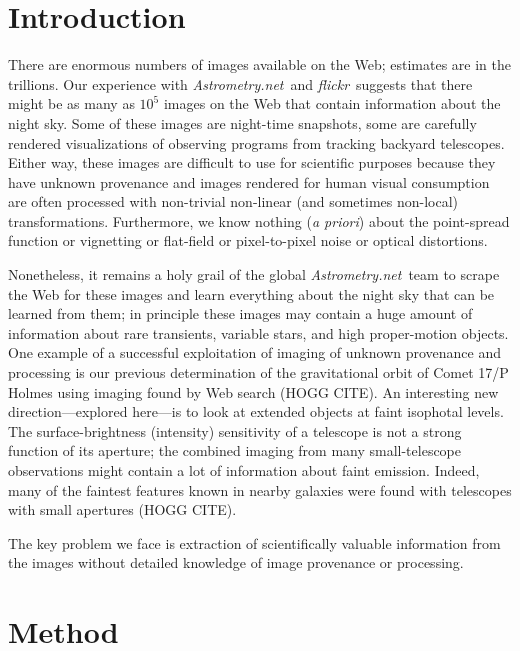 \documentclass[12pt]{article}
\newcommand{\company}[1]{\textsl{#1}}
\newcommand{\An}{\company{Astrometry.net}}
\newcommand{\flickr}{\company{flickr}}
\newcommand{\foreign}[1]{\textit{#1}}
\begin{document}
\section{Introduction}

There are enormous numbers of images available on the Web; estimates
are in the trillions.  Our experience with \An\ and \flickr\ suggests
that there might be as many as $10^5$ images on the Web that contain
information about the night sky.  Some of these images are night-time
snapshots, some are carefully rendered visualizations of observing
programs from tracking backyard telescopes.  Either way, these images
are difficult to use for scientific purposes because they have unknown
provenance and images rendered for human visual consumption are often
processed with non-trivial non-linear (and sometimes non-local)
transformations.  Furthermore, we know nothing (\foreign{a priori})
about the point-spread function or vignetting or flat-field or
pixel-to-pixel noise or optical distortions.

Nonetheless, it remains a holy grail of the global \An\ team to scrape
the Web for these images and learn everything about the night sky that
can be learned from them; in principle these images may contain a huge
amount of information about rare transients, variable stars, and high
proper-motion objects.  One example of a successful exploitation of
imaging of unknown provenance and processing is our previous
determination of the gravitational orbit of Comet 17/P Holmes using
imaging found by Web search (HOGG CITE).  An interesting new
direction---explored here---is to look at extended objects at faint
isophotal levels.  The surface-brightness (intensity) sensitivity of a
telescope is not a strong function of its aperture; the combined
imaging from many small-telescope observations might contain a lot of
information about faint emission.  Indeed, many of the faintest
features known in nearby galaxies were found with telescopes with
small apertures (HOGG CITE).

The key problem we face is extraction of scientifically valuable
information from the images without detailed knowledge of image
provenance or processing.

\section{Method}
\end{document}
